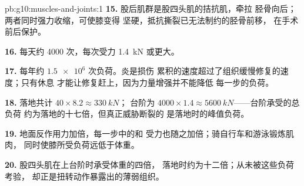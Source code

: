 \begin{solution}{pb:g10:muscles-and-joints:1}
\textbf{15.} 股后肌群是股四头肌的拮抗肌，牵拉
胫骨向后；两者同时强力收缩，可使膝变得
坚硬，抵抗撕裂已无法制约的胫骨前移，
在手术前后保护。

\textbf{16.} 每天约 4000 次，每次受力 \qty{1.4}{kN} 或更大。

\textbf{17.} 每年约 $\num{1.5e6}$ 次负荷。炎是损伤
累积的速度超过了组织缓慢修复的速度；只有休息
才能让修复赶上，因为力量增强并不能降低
每一步的负荷。

\textbf{18.} 落地共计 $40 \times 8.2 \approx \qty{330}{kN}$；
台阶为 $4000 \times 1.4 \approx \qty{5600}{kN}$——台阶承受的总负荷
约为落地的十七倍，但真正威胁断裂的
是落地时的峰值负荷。

\textbf{19.} 地面反作用力加倍，每一步中的和
受力也随之加倍；骑自行车和游泳锻炼肌肉，
同时使膝所受负荷远低于体重。

\textbf{20.} 股四头肌在上台阶时承受体重的四倍，
落地时约为十二倍；从未被这些负荷考验，
却正是扭转动作暴露出的薄弱组织。
\end{solution}
